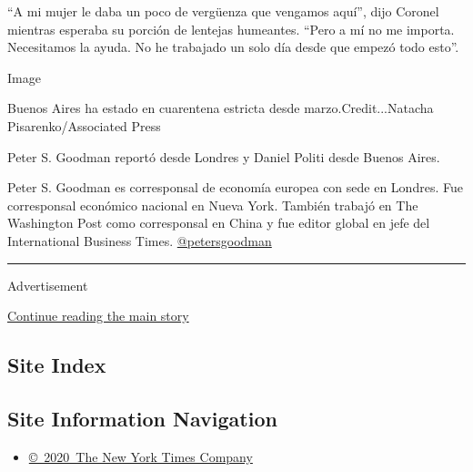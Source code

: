 ``A mi mujer le daba un poco de vergüenza que vengamos aquí'', dijo
Coronel mientras esperaba su porción de lentejas humeantes. ``Pero a mí
no me importa. Necesitamos la ayuda. No he trabajado un solo día desde
que empezó todo esto''.

Image

Buenos Aires ha estado en cuarentena estricta desde
marzo.Credit...Natacha Pisarenko/Associated Press

Peter S. Goodman reportó desde Londres y Daniel Politi desde Buenos
Aires.

Peter S. Goodman es corresponsal de economía europea con sede en
Londres. Fue corresponsal económico nacional en Nueva York. También
trabajó en The Washington Post como corresponsal en China y fue editor
global en jefe del International Business Times.
\href{https://twitter.com/petersgoodman}{@petersgoodman}

\begin{center}\rule{0.5\linewidth}{\linethickness}\end{center}

Advertisement

\protect\hyperlink{after-bottom}{Continue reading the main story}

\hypertarget{site-index}{%
\subsection{Site Index}\label{site-index}}

\hypertarget{site-information-navigation}{%
\subsection{Site Information
Navigation}\label{site-information-navigation}}

\begin{itemize}
\tightlist
\item
  \href{https://help.nytimes.com/hc/en-us/articles/115014792127-Copyright-notice}{©~2020~The
  New York Times Company}
\end{itemize}

